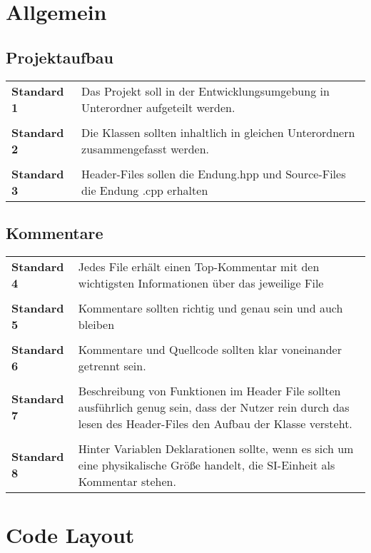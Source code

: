 \chapter{Allgemein}
\section{Projektaufbau}
\begin{table}[h]
	\begin{tabular}{lp{10cm}}
		\textbf{Standard 1} & Das Projekt soll in der Entwicklungsumgebung in Unterordner aufgeteilt werden. \\\\
		\textbf{Standard 2} & Die Klassen sollten inhaltlich in gleichen Unterordnern zusammengefasst werden. \\\\
		\textbf{Standard 3} & Header-Files sollen die Endung.hpp und Source-Files die Endung .cpp erhalten
	\end{tabular}
\end{table}

\section{Kommentare}
\begin{table}[h]
	\begin{tabular}{lp{10cm}}
	    	\textbf{Standard 4} & Jedes File erhält einen Top-Kommentar mit den wichtigsten Informationen über das jeweilige File\\\\
	    	\textbf{Standard 5} & Kommentare sollten richtig und genau sein und auch bleiben\\\\
	    	\textbf{Standard 6} & Kommentare und Quellcode sollten klar voneinander getrennt sein.\\\\
	    	\textbf{Standard 7} & Beschreibung von Funktionen im Header File sollten ausführlich genug sein, dass der Nutzer rein durch das lesen des Header-Files den Aufbau der Klasse versteht.\\\\
	        \textbf{Standard 8} & Hinter Variablen Deklarationen sollte, wenn es sich um eine physikalische Größe handelt, die SI-Einheit als Kommentar stehen.
	\end{tabular}
\end{table}

\chapter{Code Layout}
